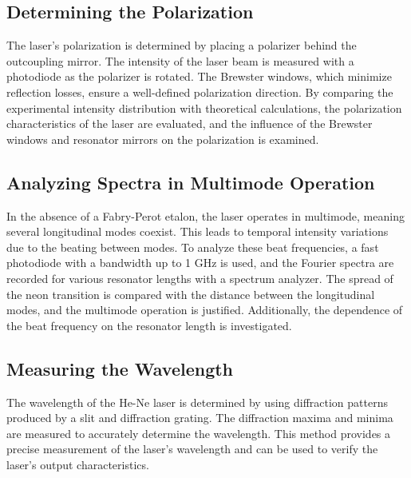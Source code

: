 \subsection{Determining the Polarization}

The laser's polarization is determined by placing a polarizer behind the outcoupling mirror. The intensity of the laser beam is measured with a photodiode as the polarizer is rotated. The Brewster windows, which minimize reflection losses, ensure a well-defined polarization direction. By comparing the experimental intensity distribution with theoretical calculations, the polarization characteristics of the laser are evaluated, and the influence of the Brewster windows and resonator mirrors on the polarization is examined.

\subsection{Analyzing Spectra in Multimode Operation}

In the absence of a Fabry-Perot etalon, the laser operates in multimode, meaning several longitudinal modes coexist. This leads to temporal intensity variations due to the beating between modes. To analyze these beat frequencies, a fast photodiode with a bandwidth up to 1 GHz is used, and the Fourier spectra are recorded for various resonator lengths with a spectrum analyzer. The spread of the neon transition is compared with the distance between the longitudinal modes, and the multimode operation is justified. Additionally, the dependence of the beat frequency on the resonator length is investigated.

\subsection{Measuring the Wavelength}

The wavelength of the He-Ne laser is determined by using diffraction patterns produced by a slit and diffraction grating. The diffraction maxima and minima are measured to accurately determine the wavelength. This method provides a precise measurement of the laser's wavelength and can be used to verify the laser's output characteristics.
